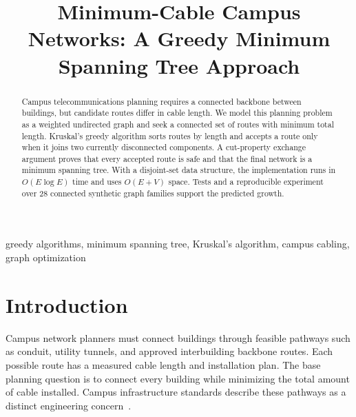 \documentclass[conference]{IEEEtran}
\begin{document}
\title{Minimum-Cable Campus Networks: A Greedy Minimum Spanning Tree Approach}

\author{
\and
{}
}

\maketitle

\begin{abstract}
Campus telecommunications planning requires a connected backbone between
buildings, but candidate routes differ in cable length. We model this planning
problem as a weighted undirected graph and seek a connected set of routes with
minimum total length. Kruskal's greedy algorithm sorts routes by length and
accepts a route only when it joins two currently disconnected components. A
cut-property exchange argument proves that every accepted route is safe and
that the final network is a minimum spanning tree. With a disjoint-set data
structure, the implementation runs in $O(E\log E)$ time and uses $O(E+V)$
space. Tests and a reproducible experiment over 28 connected synthetic graph
families support the predicted growth.
\end{abstract}

\begin{IEEEkeywords}
greedy algorithms, minimum spanning tree, Kruskal's algorithm, campus
cabling, graph optimization
\end{IEEEkeywords}

\section{Introduction}

Campus network planners must connect buildings through feasible pathways such
as conduit, utility tunnels, and approved interbuilding backbone routes. Each
possible route has a measured cable length and installation plan. The base
planning question is to connect every building while minimizing the total
amount of cable installed. Campus infrastructure standards describe these
pathways as a distinct engineering concern~\cite{yale2025infrastructure}.
\end{document}
